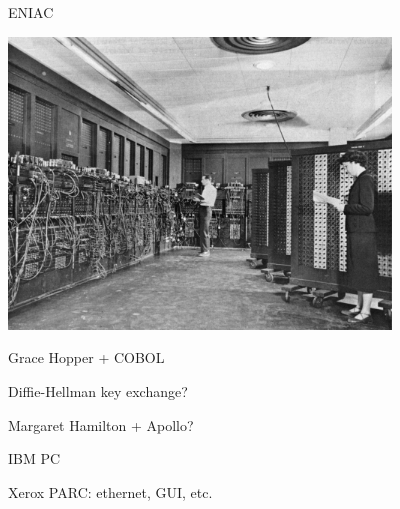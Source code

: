 \documentclass[xcolor={usenames,dvipsnames,svgnames,table},12pt]{beamer}
\begin{document}
\begin{frame}{ENIAC}
  \begin{center}
    \includegraphics[width=4in]{Eniac}
  \end{center}
\end{frame}

\begin{frame}{Grace Hopper + COBOL}

\end{frame}

\begin{frame}{Diffie-Hellman key exchange?}

\end{frame}

\begin{frame}{Margaret Hamilton + Apollo?}

\end{frame}

\begin{frame}{IBM PC}

\end{frame}

\begin{frame}{Xerox PARC: ethernet, GUI, etc.}

\end{frame}
\end{document}
